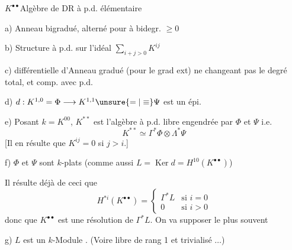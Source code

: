 $K^{\bullet\bullet}$\quad Algèbre de DR à p.d. élémentaire

a) Anneau bigradué,  alterné pour
 à bidegr. $\geq0$

b) 
Structure à p.d. sur l'idéal $\sum_{i+j>0}K^{ij}$

c) différentielle d'Anneau gradué (pour le grad ext) ne changeant pas le degré total, et comp. avec p.d.

d) $d:K^{1,0}=\Phi\longrightarrow K^{1,1}\unsure{=|\equiv}\Psi$ est un épi.

e) Posant $k=K^{00}$, $K^{**}$ est l'algèbre  à p.d. libre engendrée par $\Phi$ et $\Psi$
i.e.
\[
K^{**}\simeq\Gamma^*\Phi\otimes\Lambda^*\Psi
\]
[Il en résulte que $K^{ij}=0$ si $j>i$.]

f)  $\Phi$ et $\Psi$ sont $k$-plats
(comme aussi $L=\operatorname{Ker}d=H^{10}(K^{\bullet\bullet})$)

Il résulte déjà de ceci que
\[
H^{*i}(K^{\bullet\bullet})=
\begin{cases}
\Gamma^*L&\text{si }i=0\\
0&\text{si }i>0
\end{cases}
\]
donc que $K^{\bullet\bullet}$ est une résolution de $\Gamma^*L$.
On va supposer le plus souvent

g) $L$ est un $k$-Module .
(Voire libre de rang 1 et trivialisé $\ldots$)
